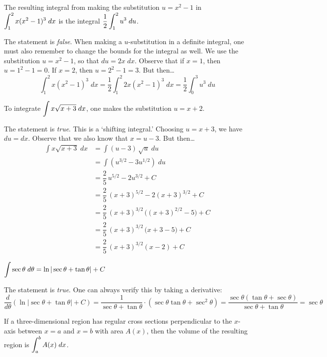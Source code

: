 \documentclass[11pt,letterpaper]{article}
\begin{document}
 The resulting integral from making the substitution $u= x^2 - 1$ in $\displaystyle\int_1^2 x(x^2 - 1)^3 \;dx$ is the integral $\displaystyle \dfrac{1}{2} \int_1^2 u^3 \;du$. \pspace

\sol The statement is \textit{false}. When making a $u$-substitution in a definite integral, one must also remember to change the bounds for the integral as well. We use the substitution $u= x^2 - 1$, so that $du= 2x \;dx$. Observe that if $x= 1$, then $u= 1^2 - 1= 0$. If $x= 2$, then $u= 2^2 - 1= 3$. But then\dots
	\[
	\int_1^2 x(x^2 - 1)^3 \;dx= \dfrac{1}{2} \int_1^2 2x(x^2 - 1)^3 \;dx= \dfrac{1}{2} \int_0^3 u^3 \;du
	\] \pvspace{1.3cm}



\newpage



 To integrate $\displaystyle\int x \sqrt{x + 3} \;dx$, one makes the substitution $u= x + 2$. \pspace

\sol The statement is \textit{true}. This is a `shifting integral.' Choosing $u= x + 3$, we have $du= dx$. Observe that we also know that $x= u - 3$. But then\dots
	\[
	\begin{aligned}
	\int x \sqrt{x + 3} \;dx&= \int (u - 3) \, \sqrt{u} \;du \\
	&= \int \left( u^{3/2} - 3u^{1/2} \right) \;du \\
	&= \dfrac{2}{5}\, u^{5/2} - 2u^{3/2} + C \\
	&= \dfrac{2}{5} \, (x + 3)^{5/2} - 2(x + 3)^{3/2} + C \\
	&= \dfrac{2}{5} \,(x + 3)^{3/2} \, \bigg( (x + 3)^{2/2} - 5 \bigg) + C \\
	&= \dfrac{2}{5} \,(x + 3)^{3/2} \, \bigg( x + 3 - 5 \bigg) + C \\
	&= \dfrac{2}{5} \,(x + 3)^{3/2} (x - 2) + C
	\end{aligned}
	\]



 $\displaystyle\int \sec \theta \;d\theta= \ln|\sec \theta + \tan \theta| + C$ \pspace

\sol The statement is \textit{true}. One can always verify this by taking a derivative:
	\[
	\dfrac{d}{d\theta} \left( \ln|\sec \theta + \tan \theta| + C \right)= \dfrac{1}{\sec \theta + \tan \theta} \cdot (\sec \theta \tan \theta + \sec^2 \theta)= \dfrac{\sec \theta (\tan \theta + \sec \theta)}{\sec \theta + \tan \theta}= \sec \theta
	\] \pvspace{1.3cm}



 If a three-dimensional region has regular cross sections perpendicular to the $x$-axis between $x= a$ and $x= b$ with area $A(x)$, then the volume of the resulting region is $\displaystyle\int_a^b A(x) \;dx$. \pspace
\end{document}
